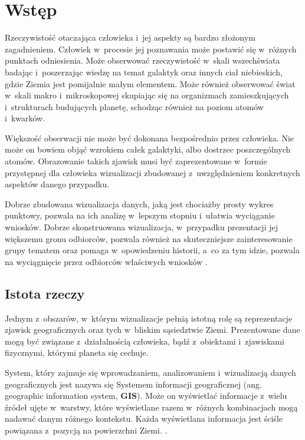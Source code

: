 \chapter{Wstęp}

Rzeczywistość otaczająca człowieka i~jej aspekty są bardzo złożonym zagadnieniem. Człowiek w~procesie jej poznawania może postawić się w~różnych punktach odniesienia. Może obserwować rzeczywistość w~skali wszechświata badając i~poszerzając wiedzę na temat galaktyk oraz innych ciał niebieskich, gdzie Ziemia jest pomijalnie małym elementem. Może również obserwować świat w~skali makro i~mikroskopowej skupiając się na organizmach zamieszkujących i~strukturach budujących planetę, schodząc również na poziom atomów i~kwarków. 

Większość obserwacji nie może być dokonana bezpośrednio przez człowieka. Nie może on bowiem objąć wzrokiem całek galaktyki, albo dostrzec poszczególnych atomów. Obrazowanie takich zjawisk musi być zaprezentowane w~formie przystępnej dla człowieka wizualizacji zbudowanej z~uwzględnieniem konkretnych aspektów danego przypadku. 

Dobrze zbudowana wizualizacja danych, jaką jest chociażby prosty wykres punktowy, pozwala na ich analizę w~lepszym stopniu i~ułatwia wyciąganie wniosków. Dobrze skonstruowana wizualizacja, w~przypadku prezentacji jej większemu gronu odbiorców, pozwala również na skuteczniejsze zainteresowanie grupy tematem oraz pomaga w~opowiedzeniu historii, a~co za tym idzie, pozwala na wyciągnięcie przez odbiorców właściwych wniosków \cite{StorytellingWithData}.

\section{Istota rzeczy}

Jednym z~obszarów, w~którym wizualizacje pełnią istotną rolę są reprezentacje zjawisk geograficznych oraz tych w~bliskim sąsiedztwie Ziemi. Prezentowane dane mogą być związane z~działalnością człowieka, bądź z~obiektami i~zjawiskami fizycznymi, którymi planeta się cechuje.

System, który zajmuje się wprowadzaniem, analizowaniem i~wizualizacją danych geograficznych jest nazywa się Systemem informacji geograficznej (ang. geographic information system, \textbf{GIS}). Może on wyświetlać informacje z~wielu źródeł ujęte w~warstwy, które wyświetlane razem w~różnych kombinacjach mogą nadawać danym różnego kontekstu. Każda wyświetlana informacja jest ściśle powiązana z~pozycją na powierzchni Ziemi. \cite[Rozdział 1.6]{IntroductionToHumanGeography}.

